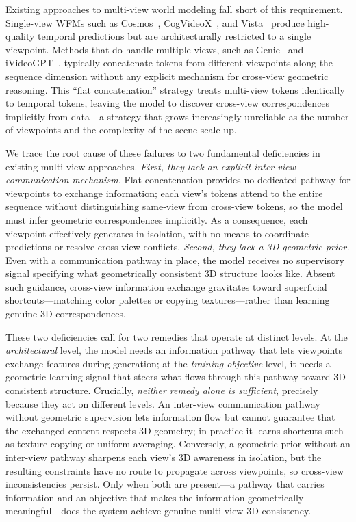 Existing approaches to multi-view world modeling fall short of this requirement. Single-view WFMs such as Cosmos~\cite{nvidia2025cosmos}, CogVideoX~\cite{yang2024cogvideox}, and Vista~\cite{gao2024vista} produce high-quality temporal predictions but are architecturally restricted to a single viewpoint. Methods that do handle multiple views, such as Genie~\cite{bruce2024genie} and iVideoGPT~\cite{wu2024ivideogpt}, typically concatenate tokens from different viewpoints along the sequence dimension without any explicit mechanism for cross-view geometric reasoning. This ``flat concatenation'' strategy treats multi-view tokens identically to temporal tokens, leaving the model to discover cross-view correspondences implicitly from data---a strategy that grows increasingly unreliable as the number of viewpoints and the complexity of the scene scale up.

We trace the root cause of these failures to two fundamental deficiencies in existing multi-view approaches. \emph{First, they lack an explicit inter-view communication mechanism.} Flat concatenation provides no dedicated pathway for viewpoints to exchange information; each view's tokens attend to the entire sequence without distinguishing same-view from cross-view tokens, so the model must infer geometric correspondences implicitly. As a consequence, each viewpoint effectively generates in isolation, with no means to coordinate predictions or resolve cross-view conflicts. \emph{Second, they lack a 3D geometric prior.} Even with a communication pathway in place, the model receives no supervisory signal specifying what geometrically consistent 3D structure looks like. Absent such guidance, cross-view information exchange gravitates toward superficial shortcuts---matching color palettes or copying textures---rather than learning genuine 3D correspondences.

These two deficiencies call for two remedies that operate at distinct levels. At the \emph{architectural} level, the model needs an information pathway that lets viewpoints exchange features during generation; at the \emph{training-objective} level, it needs a geometric learning signal that steers what flows through this pathway toward 3D-consistent structure. Crucially, \emph{neither remedy alone is sufficient}, precisely because they act on different levels. An inter-view communication pathway without geometric supervision lets information flow but cannot guarantee that the exchanged content respects 3D geometry; in practice it learns shortcuts such as texture copying or uniform averaging. Conversely, a geometric prior without an inter-view pathway sharpens each view's 3D awareness in isolation, but the resulting constraints have no route to propagate across viewpoints, so cross-view inconsistencies persist. Only when both are present---a pathway that carries information and an objective that makes the information geometrically meaningful---does the system achieve genuine multi-view 3D consistency.

